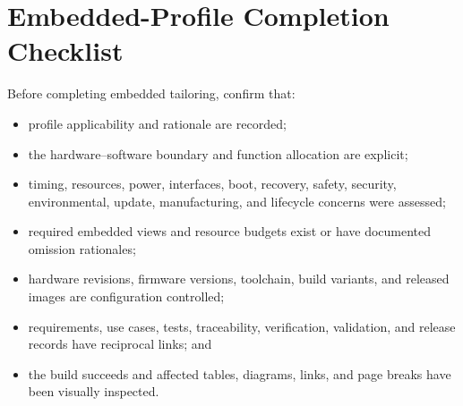 \section{Embedded-Profile Completion Checklist}
Before completing embedded tailoring, confirm that:

\begin{itemize}
\item profile applicability and rationale are recorded;
\item the hardware--software boundary and function allocation are explicit;
\item timing, resources, power, interfaces, boot, recovery, safety, security,
environmental, update, manufacturing, and lifecycle concerns were assessed;
\item required embedded views and resource budgets exist or have documented
omission rationales;
\item hardware revisions, firmware versions, toolchain, build variants, and
released images are configuration controlled;
\item requirements, use cases, tests, traceability, verification, validation,
and release records have reciprocal links; and
\item the build succeeds and affected tables, diagrams, links, and page breaks
have been visually inspected.
\end{itemize}
